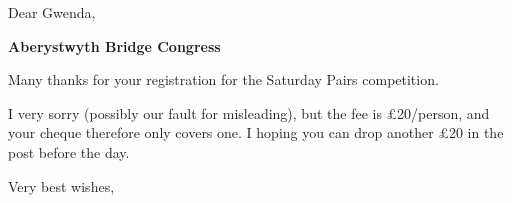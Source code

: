 \documentclass[12pt]{letter}
\begin{document}
\begin{letter}{}
\opening{Dear Gwenda,}

{\bf Aberystwyth Bridge Congress}

Many thanks for your registration for the Saturday Pairs competition.

I very sorry (possibly our fault for misleading), but the fee is
\pounds 20/person, and your cheque therefore only covers one.  I hoping you
can drop another \pounds 20 in the post before the day.

\closing{Very best wishes,}

\end{letter}
\end{document}
